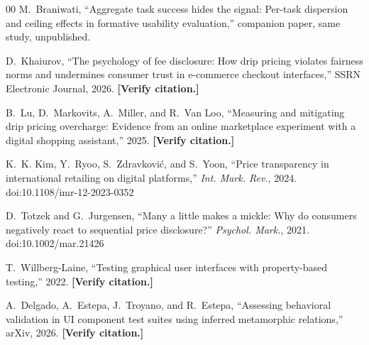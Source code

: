 \documentclass[conference]{IEEEtran}
\begin{document}
\begin{thebibliography}{00}
M.~Braniwati, ``Aggregate task success hides the signal: Per-task dispersion and ceiling effects in
formative usability evaluation,'' companion paper, same study, unpublished.

D.~Khaiurov, ``The psychology of fee disclosure: How drip pricing violates fairness norms and
undermines consumer trust in e-commerce checkout interfaces,'' SSRN Electronic Journal, 2026.
\textbf{[Verify citation.]}

B.~Lu, D.~Markovits, A.~Miller, and R.~Van Loo, ``Measuring and mitigating drip pricing overcharge:
Evidence from an online marketplace experiment with a digital shopping assistant,'' 2025.
\textbf{[Verify citation.]}

K.~K. Kim, Y.~Ryoo, S.~Zdravkovi\'{c}, and S.~Yoon, ``Price transparency in international retailing
on digital platforms,'' \textit{Int. Mark. Rev.}, 2024. doi:10.1108/imr-12-2023-0352

D.~Totzek and G.~Jurgensen, ``Many a little makes a mickle: Why do consumers negatively react to
sequential price disclosure?'' \textit{Psychol. Mark.}, 2021. doi:10.1002/mar.21426

T.~Willberg-Laine, ``Testing graphical user interfaces with property-based testing,'' 2022.
\textbf{[Verify citation.]}

A.~Delgado, A.~Estepa, J.~Troyano, and R.~Estepa, ``Assessing behavioral validation in UI component
test suites using inferred metamorphic relations,'' arXiv, 2026. \textbf{[Verify citation.]}

\end{thebibliography}
\end{document}
